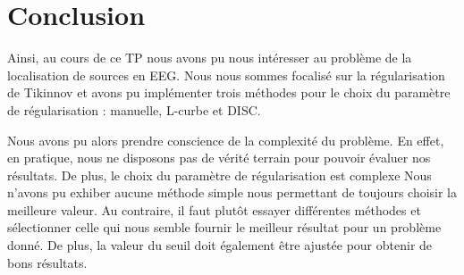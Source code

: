 \documentclass[12pt,a4paper,titlepage]{article}
\begin{document}
\section*{Conclusion}

Ainsi, au cours de ce TP nous avons pu nous intéresser au problème de la localisation de sources
en EEG. Nous nous sommes focalisé sur la régularisation de Tikinnov et avons pu implémenter
trois méthodes pour le choix du paramètre de régularisation : manuelle, L-curbe et DISC.

Nous avons pu alors prendre conscience de la complexité du problème. En effet, en pratique,
nous ne disposons pas de vérité terrain pour pouvoir évaluer nos résultats. De plus, le choix
du paramètre de régularisation est complexe Nous n'avons pu exhiber aucune méthode simple nous
permettant de toujours choisir la meilleure valeur. Au contraire, il faut plutôt essayer
différentes méthodes et sélectionner celle qui nous semble fournir le meilleur résultat
pour un problème donné. De plus, la valeur du seuil doit également être ajustée pour
obtenir de bons résultats.
\end{document}
